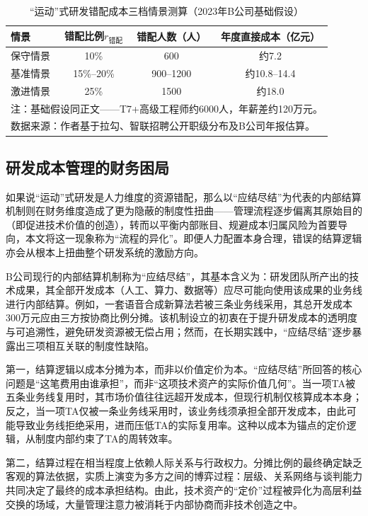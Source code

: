 \begin{table}[!htbp]
  \centering
  \caption{“运动”式研发错配成本三档情景测算（2023年B公司基础假设）}
  \label{tab:misallocation-scenarios}
  \begin{tabular}{lccc}
    \toprule
    情景 & 错配比例$r_{\text{错配}}$ & 错配人数（人）& 年度直接成本（亿元）\\
    \midrule
    保守情景 & 10\% & 600 & 约7.2 \\
    基准情景 & 15\%--20\% & 900--1200 & 约10.8--14.4 \\
    激进情景 & 25\% & 1500 & 约18.0 \\
    \bottomrule
    \multicolumn{4}{l}{\footnotesize 注：基础假设同正文——T7+高级工程师约6000人，年薪差约120万元。}\\
    \multicolumn{4}{l}{\footnotesize 数据来源：作者基于拉勾、智联招聘公开职级分布及B公司年报估算。}
  \end{tabular}
\end{table}

\subsection{研发成本管理的财务困局}
\label{subsec:cost-finance-trap}

如果说“运动”式研发是人力维度的资源错配，那么以“应结尽结”为代表的内部结算机制则在财务维度造成了更为隐蔽的制度性扭曲——管理流程逐步偏离其原始目的（即促进技术价值的创造），转而以平衡内部账目、规避成本归属风险为首要导向，本文将这一现象称为“流程的异化”。即便人力配置本身合理，错误的结算逻辑亦会从根本上扭曲整个研发系统的激励方向。

B公司现行的内部结算机制称为“应结尽结”，其基本含义为：研发团队所产出的技术成果，其全部开发成本（人工、算力、数据等）应尽可能向使用该成果的业务线进行内部结算。例如，一套语音合成新算法若被三条业务线采用，其总开发成本300万元应由三方按协商比例分摊。该机制设立的初衷在于提升研发成本的透明度与可追溯性，避免研发资源被无偿占用；然而，在长期实践中，“应结尽结”逐步暴露出三项相互关联的制度性缺陷。

第一，结算逻辑以成本分摊为本，而非以价值定价为本。“应结尽结”所回答的核心问题是“这笔费用由谁承担”，而非“这项技术资产的实际价值几何”。当一项TA被五条业务线复用时，其市场价值往往远超开发成本，但现行机制仅核算成本本身；反之，当一项TA仅被一条业务线采用时，该业务线须承担全部开发成本，由此可能导致业务线拒绝采用，进而压低TA的实际复用率。这种以成本为锚点的定价逻辑，从制度内部约束了TA的周转效率。

第二，结算过程在相当程度上依赖人际关系与行政权力。分摊比例的最终确定缺乏客观的算法依据，实质上演变为多方之间的博弈过程：层级、关系网络与谈判能力共同决定了最终的成本承担结构。由此，技术资产的“定价”过程被异化为高层利益交换的场域，大量管理注意力被消耗于内部协商而非技术创造之中。

